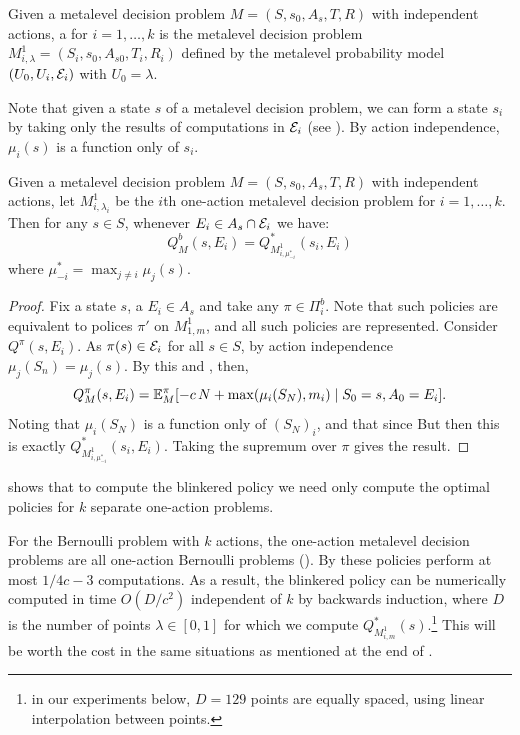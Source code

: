 \begin{dfn}\label{dfn:one-action}
	Given a metalevel decision problem $M=(S,s_0,A_s,T,R)$ with independent actions,
	a  for $i=1,\dots,k$ is the metalevel decision
	problem $M^1_{i,\lambda} = (S_i,s_0,A_{s0},T_i,R_i)$ defined by the metalevel probability
	model $(U_0,U_i,\mathcal{E}_i)$ with $U_0=\lambda$.
\end{dfn}

Note that given a state $s$ of a metalevel decision problem, we can form a state
$s_i$ by taking only the results of computations in $\mathcal{E}_i$ (see ).
By action independence, $\mu_i(s)$ is a function only of $s_i$.

\begin{thm}\label{thm:blinkered}
Given a metalevel decision problem $M=(S,s_0,A_s,T,R)$ with independent actions,
let $M^1_{i,\lambda_i}$ be the $i$th one-action metalevel decision problem for $i=1,\dots,k$.
Then for any $s\in S$, whenever $E_i\in A_s\cap\mathcal{E}_i$ we have:
\[
	Q^b_M(s,E_i) = Q^*_{M^1_{i,\mu^*_{-i}}}(s_i, E_i)
\]
where $\mu^*_{-i} = \max_{j\neq i} \mu_j(s)$.
\end{thm}

\begin{hiddenproof}
	\begin{proof}
	Fix a state $s$, a $E_i\in A_s$ and take any $\pi\in\Pi^b_i$.  Note that such policies
	are equivalent to polices $\pi'$ on $M^1_{1,m}$, and all such policies are represented.
	Consider $Q^\pi(s,E_i)$.  As $\pi(s)\in\mathcal{E}_i$ for all $s\in S$, by action independence $\mu_j(S_n) = \mu_j(s)$.
	By this and , then,
	\[
		Q^\pi_M(s,E_i) = \mathbb{E}^\pi_M[ -c\,N + \max(\mu_i(S_N), m_i) \mid S_0=s, A_0=E_i].
	\]
	Noting that $\mu_i(S_N)$ is a function only of $(S_N)_i$, and that since 
	But then this is exactly $Q^*_{M^1_{i,\mu^*_{-i}}}(s_i, E_i)$.  Taking the supremum
	over $\pi$ gives the result.
	\end{proof}	
\end{hiddenproof}

 shows that to compute the blinkered policy we need
only compute the optimal policies for $k$ separate one-action problems.

For the Bernoulli problem with $k$ actions, the one-action metalevel decision problems
are all one-action Bernoulli problems ().  By 
these policies perform at most $1/4c - 3$ computations.
As a result, the blinkered policy can be numerically computed in time $O(D/c^2)$ 
independent of $k$ by backwards induction, where $D$ is the number of points $\lambda\in[0,1]$
for which we compute $Q^*_{M^1_{i,m}}(s)$.\footnote{in our experiments below, $D=129$ points are equally spaced,
using linear interpolation between points.}  This will be worth the cost in 
the same situations as mentioned at the end of .

